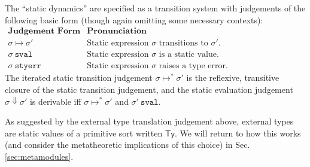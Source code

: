 \noindent
The ``static dynamics'' are specified as a transition system with judgements of the following basic form (though again omitting some necessary contexts):
\\[1ex]
$
\begin{array}{ll}
\textbf{Judgement Form} & \textbf{Pronunciation}\\
\sigma \mapsto \sigma' & \text{Static expression $\sigma$ transitions to $\sigma'$.}\\
\sigma~\mathtt{sval} & \text{Static expression $\sigma$ is a static value.}\\
\sigma~\mathtt{styerr} & \text{Static expression $\sigma$ raises a type error.}
\end{array}
$
\\[1ex]
The iterated static transition judgement $\sigma \mapsto^{*} \sigma'$ is the reflexive, transitive closure of the static transition judgement, and the static evaluation judgement $\sigma \Downarrow \sigma'$ is derivable iff $\sigma \mapsto^{*} \sigma'$ and $\sigma'~\mathtt{sval}$. 

As suggested by the external type translation judgement above, external types are static values of a primitive sort written $\mathsf{Ty}$. We will return to how this works (and consider the metatheoretic implications of this choice) in Sec. \ref{sec:metamodules}. 



